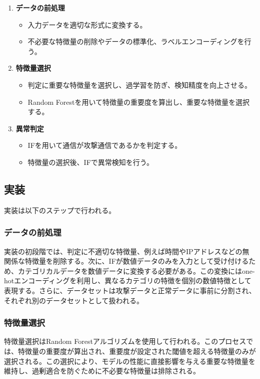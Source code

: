 \documentclass{css}
\begin{document}
\begin{enumerate}
    \item \textbf{データの前処理}
        \begin{itemize}
            \item 入力データを適切な形式に変換する。
            \item 不必要な特徴量の削除やデータの標準化、ラベルエンコーディングを行う。
        \end{itemize}
    \item \textbf{特徴量選択}
        \begin{itemize}
            \item 判定に重要な特徴量を選択し、過学習を防ぎ、検知精度を向上させる。
            \item Random Forestを用いて特徴量の重要度を算出し、重要な特徴量を選択する。
        \end{itemize}
    \item \textbf{異常判定}
        \begin{itemize}
            \item IFを用いて通信が攻撃通信であるかを判定する。
            \item 特徴量の選択後、IFで異常検知を行う。
        \end{itemize}
\end{enumerate}

\subsection{実装}
実装は以下のステップで行われる。

\subsubsection{データの前処理}

実装の初段階では、判定に不適切な特徴量、例えば時間やIPアドレスなどの無関係な特徴量を削除する。次に、IFが数値データのみを入力として受け付けるため、カテゴリカルデータを数値データに変換する必要がある。この変換にはone-hotエンコーディングを利用し、異なるカテゴリの特徴を個別の数値特徴として表現する。さらに、データセットは攻撃データと正常データに事前に分割され、それぞれ別のデータセットとして扱われる。

\subsubsection{特徴量選択}

特徴量選択はRandom Forestアルゴリズムを使用して行われる。このプロセスでは、特徴量の重要度が算出され、重要度が設定された閾値を超える特徴量のみが選択される。この選択により、モデルの性能に直接影響を与える重要な特徴量を維持し、過剰適合を防ぐために不必要な特徴量は排除される。
\end{document}

